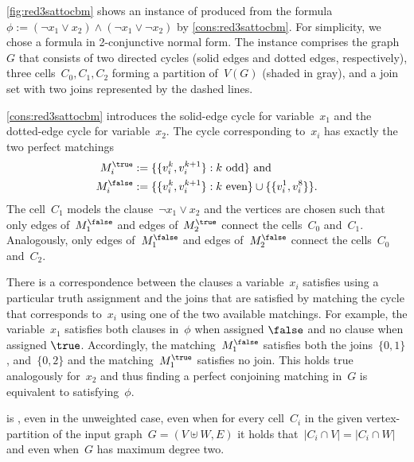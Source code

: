 \begin{example}\label{ex:red3sattocbm}
  \autoref{fig:red3sattocbm} shows an instance of \pCBMs{} produced from the formula~$\phi := (\neg x_1 \vee x_2) \wedge (\neg x_1 \vee \neg x_2)$ by \autoref{cons:red3sattocbm}. For simplicity, we chose a formula in 2-conjunctive normal form. The instance comprises the graph~$G$ that consists of two directed cycles (solid edges and dotted edges, respectively), three cells~$C_0, C_1, C_2$ forming a partition of~$V(G)$ (shaded in gray), and a join set with two joins represented by the dashed lines.

  \autoref{cons:red3sattocbm} introduces the solid-edge cycle for variable~$x_1$ and the dotted-edge cycle for variable~$x_2$. The cycle corresponding to~$x_i$ has exactly the two perfect matchings
\begin{align*}
  M^{\true}_i & := \{\{v^k_i, v^{k + 1}_i\} : k \text{ odd}\} \text{ and}\\
  M^{\false}_i & := \{\{v^k_i, v^{k + 1}_i\} : k \text{ even}\} \cup \{\{v^1_i, v^{8}_i\}\}\text{.}
\end{align*}
The cell~$C_1$ models the clause~$\neg x_1 \vee x_2$ and the vertices are chosen such that only edges of~$M^{\false}_1$ and edges of~$M^{\true}_2$ connect the cells~$C_0$ and~$C_1$. Analogously, only edges of~$M^{\false}_1$ and edges of~$M^{\false}_2$ connect the cells~$C_0$ and~$C_2$.

  There is a correspondence between the clauses a variable~$x_i$ satisfies using a particular truth assignment and the joins that are satisfied by matching the cycle that corresponds to~$x_i$ using one of the two available matchings. For example, the variable~$x_1$ satisfies both clauses in~$\phi$ when assigned $\false$ and no clause when assigned $\true$. Accordingly, the matching~$M^{\false}_1$ satisfies both the joins~$\{0, 1\}$, and~$\{0, 2\}$ and the matching~$M^{\true}_1$ satisfies no join. This holds true analogously for~$x_2$ and thus finding a perfect conjoining matching in~$G$ is equivalent to satisfying~$\phi$.
\end{example}
\begin{lemma}
  \pCBMs{} is \NPh{}, even in the unweighted case, even when for every cell~$C_i$ in the given vertex-partition of the input graph~$G=(V \uplus W, E)$ it holds that~$|C_i \cap V| = |C_i \cap W|$ and even when~$G$ has maximum degree two.
\end{lemma}

